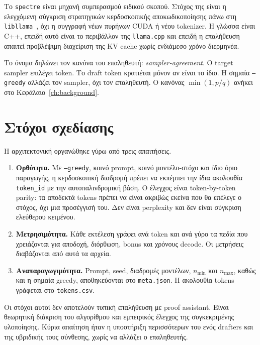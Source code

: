 \documentclass[a4paper,12pt]{report}
\theoremstyle{plain}
\theoremstyle{definition}
\theoremstyle{remark}
\begin{document}
Το \texttt{spectre} είναι μηχανή συμπερασμού ειδικού σκοπού. Στόχος της είναι
η ελεγχόμενη σύγκριση στρατηγικών κερδοσκοπικής αποκωδικοποίησης πάνω στη
\texttt{libllama}~\cite{llamacpp}, όχι η συγγραφή νέων πυρήνων CUDA ή νέου
tokenizer. Η γλώσσα είναι C++, επειδή αυτό είναι το περιβάλλον της
\texttt{llama.cpp} και επειδή η επαλήθευση απαιτεί προβλέψιμη διαχείριση της
KV cache χωρίς ενδιάμεσο χρόνο διερμηνέα.

Το όνομα δηλώνει τον κανόνα του επαληθευτή: \emph{sampler-agreement}. Ο
target sampler επιλέγει token. Το draft token κρατιέται μόνον αν είναι το
ίδιο. Η σημαία \texttt{--greedy} αλλάζει τον sampler, όχι τον επαληθευτή.
Ο κανόνας \(\min(1,p/q)\) ανήκει στο Κεφάλαιο~\ref{ch:background}.

\section{Στόχοι σχεδίασης}
\label{sec:design-goals}

Η αρχιτεκτονική οργανώθηκε γύρω από τρεις απαιτήσεις.

\begin{enumerate}[leftmargin=*]
  \item \textbf{Ορθότητα.}
    Με \texttt{--greedy}, κοινό prompt, κοινό μοντέλο-στόχο και ίδιο όριο
    παραγωγής, η κερδοσκοπική διαδρομή πρέπει να εκπέμπει την ίδια ακολουθία
    \texttt{token\_id} με την αυτοπαλινδρομική βάση. Ο έλεγχος είναι
    token-by-token parity: τα αποδεκτά tokens πρέπει να είναι ακριβώς εκείνα
    που θα επέλεγε ο στόχος, όχι μια προσέγγισή του. Δεν είναι perplexity και
    δεν είναι σύγκριση ελεύθερου κειμένου.
  \item \textbf{Μετρησιμότητα.}
    Κάθε εκτέλεση γράφει ανά token και ανά γύρο τα πεδία που χρειάζονται για
    αποδοχή, διόρθωση, bonus και χρόνους decode. Οι μετρήσεις διαβάζονται από
    αυτά τα αρχεία.
  \item \textbf{Αναπαραγωγιμότητα.}
    Prompt, seed, διαδρομές μοντέλων, \(n_{\min}\) και \(n_{\max}\), καθώς και
    η σημαία greedy, αποθηκεύονται στο \texttt{meta.json}. Η ακολουθία tokens
    γράφεται στο \texttt{tokens.csv}.
\end{enumerate}

Οι στόχοι αυτοί δεν αποτελούν τυπική επαλήθευση με proof assistant. Είναι
θεωρητική διάκριση του αλγορίθμου και εμπειρικός έλεγχος της συγκεκριμένης
υλοποίησης. Κύρια απαίτηση ήταν η υποστήριξη περισσότερων του ενός drafters
και της υβριδικής τους σύνθεσης, χωρίς να αλλάζει ο επαληθευτής.
\end{document}
